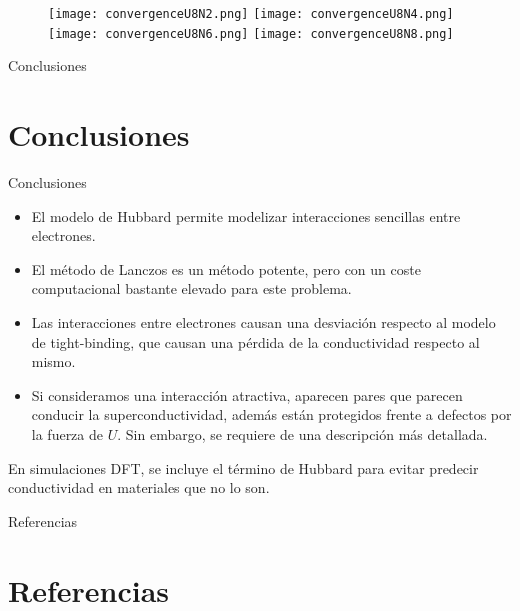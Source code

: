\documentclass{beamer}
\begin{document}
\begin{frame}
    \begin{figure}
        \begin{center}
            \texttt{[image: convergenceU8N2.png]}
            \texttt{[image: convergenceU8N4.png]}
            \texttt{[image: convergenceU8N6.png]}
            \texttt{[image: convergenceU8N8.png]}
        \end{center}
        \label{fig:convergenceBad}
    \end{figure}
\end{frame}
\begin{frame}{Conclusiones}
    \section{Conclusiones}
    \begin{block}{Conclusiones}
        \begin{itemize}
            \item El modelo de Hubbard permite modelizar interacciones sencillas entre electrones.
            \item El método de Lanczos es un método potente, pero con un coste computacional bastante elevado para este problema.
            \item Las interacciones entre electrones causan una desviación respecto al modelo de tight-binding, que causan una pérdida de la conductividad respecto al mismo.
            \item Si consideramos una interacción atractiva, aparecen pares que parecen conducir la superconductividad, además están protegidos frente a defectos por la fuerza de $U$. Sin embargo, se requiere de una descripción más detallada.
        \end{itemize}
    \end{block}
    En simulaciones DFT, se incluye el término de Hubbard para evitar predecir conductividad en materiales que no lo son.
\end{frame}
\begin{frame}[allowframebreaks]{Referencias}
    \section{Referencias}
    \printbibliography
\end{frame}
\end{document}
